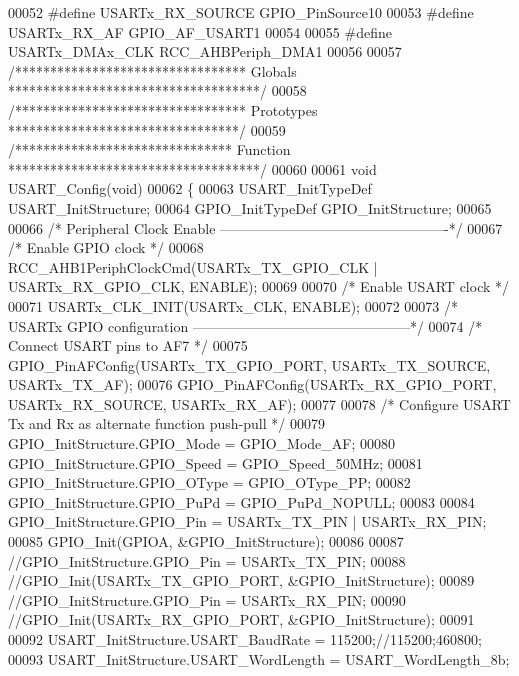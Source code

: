 \begin{DoxyCode}
00052 \textcolor{preprocessor}{#}\textcolor{preprocessor}{define} \textcolor{preprocessor}{USARTx\_RX\_SOURCE}                 GPIO_PinSource10
00053 \textcolor{preprocessor}{#}\textcolor{preprocessor}{define} \textcolor{preprocessor}{USARTx\_RX\_AF}                     GPIO_AF_USART1
00054 
00055 \textcolor{preprocessor}{#}\textcolor{preprocessor}{define} \textcolor{preprocessor}{USARTx\_DMAx\_CLK}                  \textcolor{preprocessor}{RCC\_AHBPeriph\_DMA1}
00056 
00057 \textcolor{comment}{/********************************* Globals ************************************/}
00058 \textcolor{comment}{/********************************* Prototypes *********************************/}
00059 \textcolor{comment}{/*******************************  Function ************************************/}
00060 
00061 \textcolor{keywordtype}{void} USART_Config(\textcolor{keywordtype}{void})
00062 \{
00063   USART\_InitTypeDef USART\_InitStructure;
00064   GPIO\_InitTypeDef GPIO\_InitStructure;
00065 
00066   \textcolor{comment}{/* Peripheral Clock Enable -------------------------------------------------*/}
00067   \textcolor{comment}{/* Enable GPIO clock */}
00068   RCC_AHB1PeriphClockCmd(USARTx_TX_GPIO_CLK | USARTx_RX_GPIO_CLK, ENABLE);
00069 
00070   \textcolor{comment}{/* Enable USART clock */}
00071   USARTx_CLK_INIT(USARTx_CLK, ENABLE);
00072 
00073   \textcolor{comment}{/* USARTx GPIO configuration -----------------------------------------------*/}
00074   \textcolor{comment}{/* Connect USART pins to AF7 */}
00075   GPIO_PinAFConfig(USARTx_TX_GPIO_PORT, USARTx_TX_SOURCE, USARTx_TX_AF);
00076   GPIO_PinAFConfig(USARTx_RX_GPIO_PORT, USARTx_RX_SOURCE, USARTx_RX_AF);
00077 
00078   \textcolor{comment}{/* Configure USART Tx and Rx as alternate function push-pull */}
00079   GPIO\_InitStructure.GPIO_Mode = GPIO_Mode_AF;
00080   GPIO\_InitStructure.GPIO_Speed = GPIO_Speed_50MHz;
00081   GPIO\_InitStructure.GPIO_OType = GPIO_OType_PP;
00082   GPIO\_InitStructure.GPIO_PuPd = GPIO_PuPd_NOPULL;
00083 
00084   GPIO\_InitStructure.GPIO_Pin = USARTx_TX_PIN | USARTx_RX_PIN;
00085   GPIO_Init(GPIOA, &GPIO\_InitStructure);
00086 
00087   \textcolor{comment}{//GPIO\_InitStructure.GPIO\_Pin = USARTx\_TX\_PIN;}
00088   \textcolor{comment}{//GPIO\_Init(USARTx\_TX\_GPIO\_PORT, &GPIO\_InitStructure);}
00089   \textcolor{comment}{//GPIO\_InitStructure.GPIO\_Pin = USARTx\_RX\_PIN;}
00090   \textcolor{comment}{//GPIO\_Init(USARTx\_RX\_GPIO\_PORT, &GPIO\_InitStructure);}
00091 
00092   USART\_InitStructure.USART_BaudRate =  115200;\textcolor{comment}{//115200;460800;}
00093   USART\_InitStructure.USART_WordLength = USART_WordLength_8b;

\end{DoxyCode}
